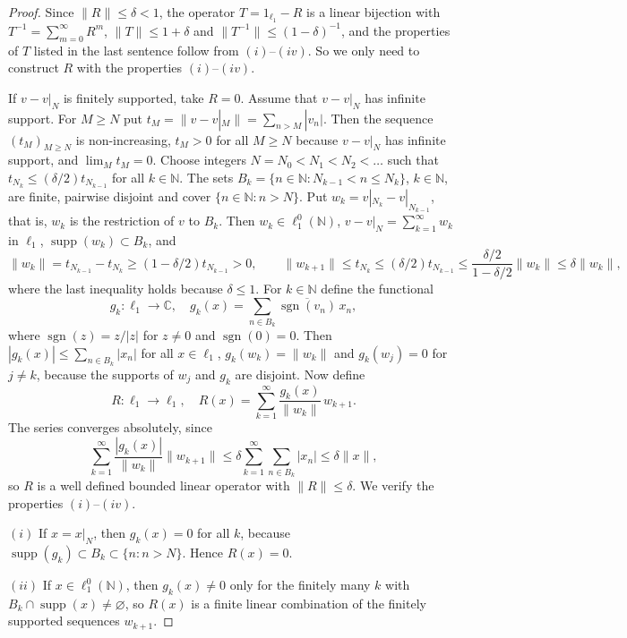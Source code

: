 \documentclass[12pt]{article}
\newcommand{\lo}[1]{\ell_1^0(#1)}
\newcommand{\norm}[1]{\lVert #1\rVert}
\newcommand{\supp}{\operatorname{supp}}
\begin{document}
\begin{proof} Since $\norm{R}\leq\delta<1$, the operator $T=1_{\ell_1}-R$ is a
    linear bijection with $T^{-1}=\sum_{m=0}^\infty R^m$,
    $\norm{T}\leq 1+\delta$ and $\norm{T^{-1}}\leq{(1-\delta)}^{-1}$, and the
    properties of $T$ listed in the last sentence follow from $(i)$--$(iv)$.
    So we only need to construct $R$ with the properties $(i)$--$(iv)$.

    If $v-v|_N$ is finitely supported, take $R=0$. Assume that $v-v|_N$ has
    infinite support. For $M\geq N$ put $t_M=\norm{v-v|_M}=\sum_{n>M}|v_n|$.
    Then the sequence ${(t_M)}_{M\geq N}$ is non-increasing, $t_M>0$ for all
    $M\geq N$ because $v-v|_N$ has infinite support, and $\lim_M t_M=0$.
    Choose integers $N=N_0<N_1<N_2<\ldots$ such that
    $t_{N_k}\leq(\delta/2)t_{N_{k-1}}$ for all $k\in\mathbb{N}$. The sets
    $B_k=\{n\in\mathbb{N}:N_{k-1}<n\leq N_k\}$, $k\in\mathbb{N}$, are finite,
    pairwise disjoint and cover $\{n\in\mathbb{N}:n>N\}$. Put
    $w_k=v|_{N_k}-v|_{N_{k-1}}$, that is, $w_k$ is the restriction of $v$ to
    $B_k$. Then $w_k\in\lo{\mathbb{N}}$, $v-v|_N=\sum_{k=1}^\infty w_k$ in
    $\ell_1$, $\supp(w_k)\subset B_k$, and
    \[
    \norm{w_k}=t_{N_{k-1}}-t_{N_k}\geq(1-\delta/2)t_{N_{k-1}}>0,\qquad
    \norm{w_{k+1}}\leq t_{N_k}\leq(\delta/2)t_{N_{k-1}}\leq
    \frac{\delta/2}{1-\delta/2}\norm{w_k}\leq\delta\norm{w_k},
    \]
    where the last inequality holds because $\delta\leq 1$. For
    $k\in\mathbb{N}$ define the functional
    \[
    g_k:\ell_1\to\mathbb{C},\quad
    g_k(x)=\sum_{n\in B_k}\overline{\operatorname{sgn}(v_n)}\,x_n,
    \]
    where $\operatorname{sgn}(z)=z/|z|$ for $z\neq 0$ and
    $\operatorname{sgn}(0)=0$. Then $|g_k(x)|\leq\sum_{n\in B_k}|x_n|$ for
    all $x\in\ell_1$, $g_k(w_k)=\norm{w_k}$ and $g_k(w_j)=0$ for $j\neq k$,
    because the supports of $w_j$ and $g_k$ are disjoint. Now define
    \[
    R:\ell_1\to\ell_1,\quad
    R(x)=\sum_{k=1}^\infty\frac{g_k(x)}{\norm{w_k}}\,w_{k+1}.
    \]
    The series converges absolutely, since
    \[
    \sum_{k=1}^\infty\frac{|g_k(x)|}{\norm{w_k}}\norm{w_{k+1}}
    \leq\delta\sum_{k=1}^\infty\sum_{n\in B_k}|x_n|\leq\delta\norm{x},
    \]
    so $R$ is a well defined bounded linear operator with $\norm{R}\leq\delta$.
    We verify the properties $(i)$--$(iv)$.

    $(i)$ If $x=x|_N$, then $g_k(x)=0$ for all $k$, because
    $\supp(g_k)\subset B_k\subset\{n:n>N\}$. Hence $R(x)=0$.

    $(ii)$ If $x\in\lo{\mathbb{N}}$, then $g_k(x)\neq 0$ only for the finitely
    many $k$ with $B_k\cap\supp(x)\neq\varnothing$, so $R(x)$ is a finite
    linear combination of the finitely supported sequences $w_{k+1}$.


\end{proof}
\end{document}
